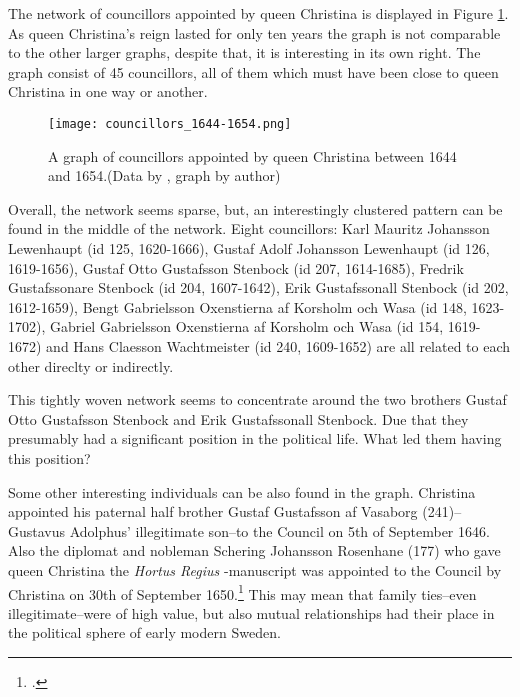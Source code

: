 The network of councillors appointed by queen Christina is displayed in Figure \ref{queenChristinaCouncillors}. As queen Christina's reign lasted for only ten years the graph is not comparable to the other larger graphs, despite that, it is interesting in its own right. The graph consist of 45 councillors, all of them which must have been close to queen Christina in one way or another.

\begin{figure}	
	\texttt{[image: councillors\_1644-1654.png]}
	\caption[Councillors appointed by queen Christina]{A graph of councillors appointed by queen Christina between 1644 and 1654.(Data by \cite{councillorsDS}, graph by author)}
	\label{queenChristinaCouncillors}
	\centering
\end{figure}

Overall, the network seems sparse, but, an interestingly clustered pattern can be found in the middle of the network. Eight councillors: Karl Mauritz Johansson Lewenhaupt (id 125, 1620-1666), Gustaf Adolf Johansson Lewenhaupt (id 126, 1619-1656), Gustaf Otto Gustafsson Stenbock (id 207, 1614-1685), Fredrik Gustafssonare Stenbock (id 204, 1607-1642), Erik Gustafssonall Stenbock (id 202, 1612-1659), Bengt Gabrielsson Oxenstierna af Korsholm och Wasa (id 148, 1623-1702), Gabriel Gabrielsson Oxenstierna af Korsholm och Wasa (id 154, 1619-1672) and Hans Claesson Wachtmeister (id 240, 1609-1652) are all related to each other direclty or indirectly. 

This tightly woven network seems to concentrate around the two brothers Gustaf Otto Gustafsson Stenbock and Erik Gustafssonall Stenbock. Due that they presumably had a significant position in the political life. What led them having this position?

Some other interesting individuals can be also found in the graph. Christina appointed his paternal half brother Gustaf Gustafsson af Vasaborg (241)–Gustavus Adolphus' illegitimate son–to the Council on 5th of September 1646. Also the diplomat and nobleman Schering Johansson Rosenhane (177) who gave queen Christina the \textit{Hortus Regius} -manuscript was appointed to the Council by Christina on 30th of September 1650.\footcite{councillorsDS} This may mean that family ties–even illegitimate–were of high value, but also mutual relationships had their place in the political sphere of early modern Sweden.
